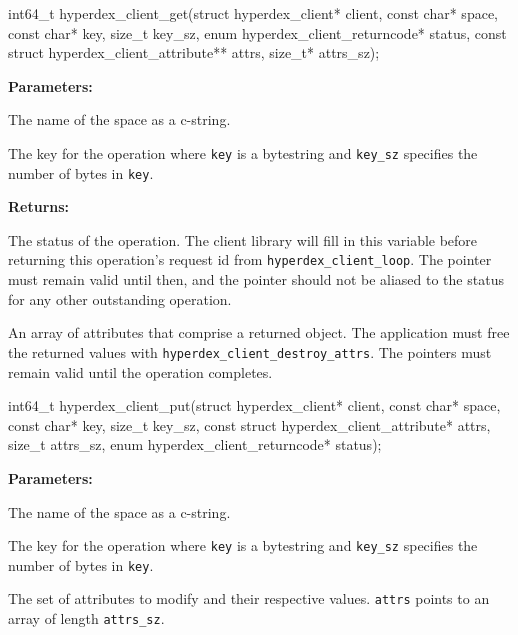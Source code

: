 
\begin{ccode}
int64_t hyperdex_client_get(struct hyperdex_client* client,
                const char* space,
                const char* key, size_t key_sz,
                enum hyperdex_client_returncode* status,
                const struct hyperdex_client_attribute** attrs, size_t* attrs_sz);
\end{ccode}
\funcdesc 

\noindent\textbf{Parameters:}
\begin{description}[labelindent=\widthof{{\texttt{key}, \texttt{key\_sz}}},leftmargin=*,noitemsep,nolistsep,align=right]
\item[\texttt{space}] The name of the space as a c-string.
\item[\texttt{key}, \texttt{key\_sz}] The key for the operation where \texttt{key} is a bytestring and \texttt{key\_sz} specifies the number of bytes in \texttt{key}.
\end{description}

\noindent\textbf{Returns:}
\begin{description}[labelindent=\widthof{{\texttt{attrs}, \texttt{attrs\_sz}}},leftmargin=*,noitemsep,nolistsep,align=right]
\item[\texttt{status}] The status of the operation.  The client library will fill in this variable before returning this operation's request id from \texttt{hyperdex\_client\_loop}.  The pointer must remain valid until then, and the pointer should not be aliased to the status for any other outstanding operation.
\item[\texttt{attrs}, \texttt{attrs\_sz}] An array of attributes that comprise a returned object.  The application must free the returned values with \texttt{hyperdex\_client\_destroy\_attrs}.  The pointers must remain valid until the operation completes.
\end{description}

\funcsep
\begin{ccode}
int64_t hyperdex_client_put(struct hyperdex_client* client,
                const char* space,
                const char* key, size_t key_sz,
                const struct hyperdex_client_attribute* attrs, size_t attrs_sz,
                enum hyperdex_client_returncode* status);
\end{ccode}
\funcdesc 

\noindent\textbf{Parameters:}
\begin{description}[labelindent=\widthof{{\texttt{attrs}, \texttt{attrs\_sz}}},leftmargin=*,noitemsep,nolistsep,align=right]
\item[\texttt{space}] The name of the space as a c-string.
\item[\texttt{key}, \texttt{key\_sz}] The key for the operation where \texttt{key} is a bytestring and \texttt{key\_sz} specifies the number of bytes in \texttt{key}.
\item[\texttt{attrs}, \texttt{attrs\_sz}] The set of attributes to modify and their respective values.  \texttt{attrs} points to an array of length \texttt{attrs\_sz}.
\end{description}

